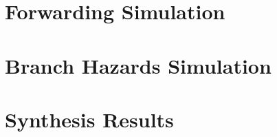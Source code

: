 \documentclass[11pt,a4paper,titlepage,oneside]{article}
\begin{document}
\maketitle

\section*{Forwarding Simulation}

\clearpage
\section*{Branch Hazards Simulation}

\clearpage
\section*{Synthesis Results}

\end{document}
